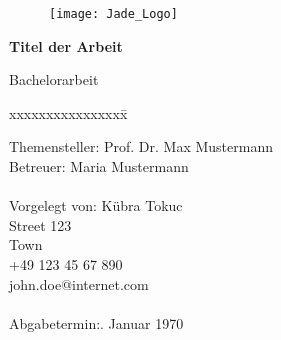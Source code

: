 \begin{titlepage}
  \begin{centering}
  \begin{figure}[h!]
    \centering
    \texttt{[image: Jade\_Logo]}
  \end{figure}



  \vspace*{0.4cm}

  \textsf{\Huge \textbf{Titel der Arbeit\\}}

  \vspace*{0.5cm}
  \noindent Bachelorarbeit\\

  \end{centering}

  \vspace*{1.5cm}
  \begin{tabbing}
  xxxxxxxxxxxxxxxx\= \kill

  \small Themensteller:\> Prof. Dr. Max Mustermann\\
  \small Betreuer:\> Maria Mustermann\\\\

  \small Vorgelegt von: \>Kübra Tokuc\\
  \small \>Street 123\\
  \small {} Town\\
  \small \>+49 123 45 67 890\\
  \small \>john.doe@internet.com\\\\

  \small Abgabetermin:. Januar 1970
  \end{tabbing}
\end{titlepage}
\newpage
